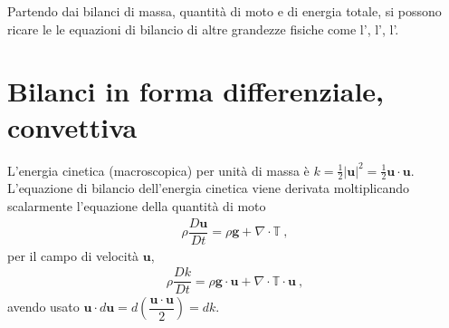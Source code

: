 \documentclass[letterpaper,10pt,english]{jupyterBook}
\begin{document}
\sphinxAtStartPar
Partendo dai bilanci di massa, quantità di moto e di energia totale, si possono ricare le le equazioni di bilancio di altre grandezze fisiche come l’, l’, l’.


\section{Bilanci in forma differenziale, convettiva}
\label{\detokenize{ch/continuum/derived-balances:bilanci-in-forma-differenziale-convettiva}}
\sphinxAtStartPar
{} L’energia cinetica (macroscopica) per unità di massa è \(k = \frac{1}{2}|\mathbf{u}|^2 = \frac{1}{2} \mathbf{u} \cdot \mathbf{u}\). L’equazione di bilancio dell’energia cinetica viene derivata moltiplicando scalarmente l’equazione della quantità di moto
\begin{equation*}
\begin{split}\rho \dfrac{D \mathbf{u}}{Dt} = \rho \mathbf{g} + \nabla \cdot \mathbb{T} \ ,\end{split}
\end{equation*}
\sphinxAtStartPar
per il campo di velocità \(\mathbf{u}\),
\begin{equation*}
\begin{split}\rho \dfrac{D k}{Dt} = \rho \mathbf{g} \cdot \mathbf{u} + \nabla \cdot \mathbb{T} \cdot \mathbf{u} \ ,\end{split}
\end{equation*}
\sphinxAtStartPar
avendo usato \(\mathbf{u} \cdot d \mathbf{u} = d \left( \dfrac{\mathbf{u} \cdot \mathbf{u}}{2} \right) = dk\).
\end{document}
